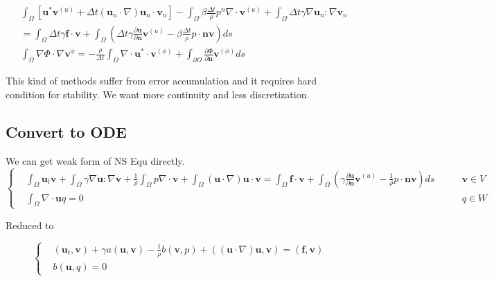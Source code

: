 \begin{equation}
    \begin{aligned}
        &\int_\Omega\left[\textbf{u}^*\textbf{v}^{(u)}+\Delta t(\textbf{u}_n\cdot \nabla)\textbf{u}_n\cdot \textbf{v}_n\right]-\int_\Omega\beta \frac{\Delta t}{\rho}p^n\nabla\cdot \textbf{v}^{(u)}
        +\int_\Omega \Delta t\gamma \nabla\textbf{u}_n:\nabla \textbf{v}_n\\
        &=\int_\Omega\Delta t \gamma \textbf{f}\cdot \textbf{v} + \int_\Omega\left(\Delta t\gamma\frac{\partial \textbf{u}}{\partial \textbf{n}}\textbf{v}^{(u)}-\beta\frac{\Delta t}{\rho}p\cdot\textbf{n}\textbf{v}\right)ds\\
        &\int_{\Omega} \nabla \Phi\cdot \nabla \textbf{v}^{\phi}=-\frac{\rho}{\Delta t}\int_\Omega \nabla \cdot \textbf{u}^*\cdot \textbf{v}^{(\phi)}+\int_{\partial\Omega}\frac{\partial \Phi}{\partial \textbf{n}}\textbf{v}^{(\phi)}ds
    \end{aligned}
\end{equation}

This kind of methods suffer from error accumulation and it requires hard condition for stability. We want more continuity and less discretization.

\subsection{Convert to ODE}
We can get weak form of NS Equ directly.
\begin{equation*}\left\{
    \begin{aligned}
        &\int_\Omega \textbf{u}_t \textbf{v} + \int_\Omega \gamma \nabla \textbf{u}:\nabla\textbf{v} + \frac{1}{\rho}\int_\Omega p\nabla \cdot\textbf{v}+\int_\Omega(\textbf{u}\cdot \nabla) \textbf{u}\cdot\textbf{v}
        =\int_\Omega \textbf{f}\cdot\textbf{v}+ \int_\Omega\left(\gamma\frac{\partial \textbf{u}}{\partial \textbf{n}}\textbf{v}^{(u)}-\frac{1}{\rho}p\cdot\textbf{n}\textbf{v}\right)ds\qquad &\textbf{v}\in V\\
        &\int_\Omega \nabla\cdot \textbf{u} q=0 &q\in W
    \end{aligned}\right.
\end{equation*}

Reduced to 

\begin{equation*}\left\{
    \begin{aligned}
        &(\textbf{u}_t, \textbf{v})+\gamma a(\textbf{u}, \textbf{v})-\frac{1}{\rho}b(\textbf{v}, p)+((\textbf{u}\cdot \nabla)\textbf{u}, \textbf{v})=(\textbf{f}, \textbf{v})\\
        &b(\textbf{u}, q)=0
    \end{aligned}\right.
\end{equation*}


